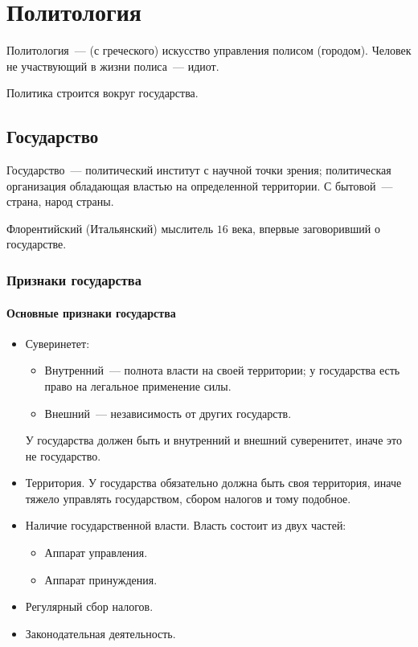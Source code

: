 \documentclass[12pt]{article}
\begin{document}
	\tableofcontents
	\setcounter{tocdepth}{4}
	\newpage
	
	\section{Политология}
	\begin{definition}
		Политология~--- (с греческого) искусство управления полисом (городом). Человек не участвующий в жизни полиса~--- идиот.
	\end{definition}
	\noindent
	Политика строится вокруг государства.
	\subsection{Государство}
	\begin{definition}
		Государство~--- политический институт с научной точки зрения; политическая организация обладающая властью на определенной территории. С бытовой~--- страна, народ страны.
	\end{definition}
	\begin{person}
		Флорентийский (Итальянский) мыслитель $16$ века, впервые заговоривший о государстве.
	\end{person}
	\subsubsection{Признаки государства}
	\paragraph{Основные признаки государства}
	\begin{itemize}
		\item Суверинетет:
		\begin{itemize}
			\item Внутренний~--- полнота власти на своей территории; у государства есть право на легальное применение силы.
			\item Внешний~--- независимость от других государств.
		\end{itemize}
		У государства должен быть и внутренний и внешний суверенитет, иначе это не государство.
		\item Территория. У государства обязательно должна быть своя территория, иначе тяжело управлять государством, сбором налогов и тому подобное.
		\item Наличие государственной власти. Власть состоит из двух частей:
		\begin{itemize}
			\item Аппарат управления.
			\item Аппарат принуждения.
		\end{itemize}
		\item Регулярный сбор налогов.
		\item Законодательная деятельность.
	\end{itemize}
\end{document}
